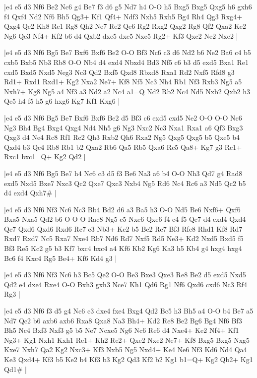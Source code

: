\whitename{}
\blackname{}
\makegametitle
|e4 e5 d3 Nf6 Be2 Nc6 g4 Be7 f3 d6 g5 Nd7 h4 O-O h5 Bxg5 Bxg5 Qxg5 h6 gxh6 f4 Qxf4 Nd2 Nf6 Bh5 Qg3+ Kf1 Qf4+ Ndf3 Nxh5 Rxh5 Bg4 Rh4 Qg3 Rxg4+ Qxg4 Qe2 Kh8 Re1 Rg8 Qh2 Ne7 Re2 Qe6 Rg2 Rxg2 Qxg2 Rg8 Qf2 Qxa2 Ke2 Ng6 Qe3 Nf4+ Kf2 b6 d4 Qxb2 dxe5 dxe5 Nxe5 Rg2+ Kf3 Qxc2 Ne2 Nxe2  |

\whitename{}
\blackname{}
\makegametitle
|e4 e5 d3 Nf6 Bg5 Be7 Bxf6 Bxf6 Be2 O-O Bf3 Nc6 c3 d6 Nd2 b6 Ne2 Ba6 c4 b5 cxb5 Bxb5 Nb3 Rb8 O-O Nb4 d4 exd4 Nbxd4 Bd3 Nf5 c6 b3 d5 exd5 Bxa1 Re1 cxd5 Bxd5 Nxd5 Neg3 Nc3 Qd2 Bxf5 Qxd8 Rbxd8 Rxa1 Rd2 Nxf5 Rfd8 g3 Rd1+ Rxd1 Rxd1+ Kg2 Nxa2 Ne7+ Kf8 Nf5 Nc3 Nh4 Rb1 Nf3 Rxb3 Ng5 a5 Nxh7+ Kg8 Ng5 a4 Nf3 a3 Nd2 a2 Nc4 a1=Q Nd2 Rb2 Nc4 Nd5 Nxb2 Qxb2 h3 Qe5 h4 f5 h5 g6 hxg6 Kg7 Kf1 Kxg6  |

\whitename{}
\blackname{}
\makegametitle
|e4 e5 d3 Nf6 Bg5 Be7 Bxf6 Bxf6 Be2 d5 Bf3 c6 exd5 cxd5 Ne2 O-O O-O Nc6 Ng3 Bh4 Bg4 Bxg4 Qxg4 Nd4 Nh5 g6 Ng3 Nxc2 Nc3 Nxa1 Rxa1 a6 Qf3 Bxg3 Qxg3 d4 Ne4 Rc8 Rf1 Rc2 Qh3 Rxb2 Qh6 Rxa2 Ng5 Qxg5 Qxg5 b5 Qxe5 b4 Qxd4 b3 Qc4 Rb8 Rb1 b2 Qxa2 Rb6 Qa5 Rb5 Qxa6 Rc5 Qa8+ Kg7 g3 Rc1+ Rxc1 bxc1=Q+ Kg2 Qd2  |

\whitename{}
\blackname{}
\makegametitle
|e4 e5 d3 Nf6 Bg5 Be7 h4 Nc6 c3 d5 f3 Be6 Na3 a6 b4 O-O Nh3 Qd7 g4 Rad8 exd5 Nxd5 Bxe7 Nxc3 Qc2 Qxe7 Qxc3 Nxb4 Ng5 Rd6 Nc4 Rc6 a3 Nd5 Qc2 b5 d4 exd4 Qxh7\#  |

\whitename{}
\blackname{}
\makegametitle
|e4 e5 d3 Nf6 Nf3 Nc6 Nc3 Bb4 Bd2 d6 a3 Ba5 h3 O-O Nd5 Be6 Nxf6+ Qxf6 Bxa5 Nxa5 Qd2 b6 O-O-O Rac8 Ng5 c5 Nxe6 Qxe6 f4 c4 f5 Qe7 d4 exd4 Qxd4 Qc7 Qxd6 Qxd6 Rxd6 Rc7 c3 Nb3+ Kc2 b5 Be2 Re7 Bf3 Rfe8 Rhd1 Kf8 Rd7 Rxd7 Rxd7 Nc5 Rxa7 Nxe4 Rb7 Nd6 Rd7 Nxf5 Rd5 Ne3+ Kd2 Nxd5 Bxd5 f5 Bf3 Re5 Kc2 g5 b3 Kf7 bxc4 bxc4 a4 Kf6 Kb2 Kg6 Ka3 h5 Kb4 g4 hxg4 hxg4 Bc6 f4 Kxc4 Rg5 Be4+ Kf6 Kd4 g3  |

\whitename{}
\blackname{}
\makegametitle
|e4 e5 d3 Nf6 Nf3 Nc6 h3 Bc5 Qe2 O-O Be3 Bxe3 Qxe3 Re8 Be2 d5 exd5 Nxd5 Qd2 e4 dxe4 Rxe4 O-O Bxh3 gxh3 Nce7 Kh1 Qd6 Rg1 Nf6 Qxd6 cxd6 Nc3 Rf4 Rg3  |

\whitename{}
\blackname{}
\makegametitle
|e4 e5 d3 Nf6 f3 d5 g4 Nc6 c3 dxe4 fxe4 Bxg4 Qd2 Bc5 h3 Bh5 a4 O-O b4 Be7 a5 Nd7 Qc2 b6 axb6 axb6 Rxa8 Qxa8 Na3 Bh4+ Kd2 Re8 Be2 Bg6 Bg4 Nf6 Bf3 Bh5 Nc4 Bxf3 Nxf3 g5 b5 Ne7 Ncxe5 Ng6 Nc6 Re6 d4 Nxe4+ Ke2 Nf4+ Kf1 Ng3+ Kg1 Nxh1 Kxh1 Re1+ Kh2 Re2+ Qxe2 Nxe2 Ne7+ Kf8 Bxg5 Bxg5 Nxg5 Kxe7 Nxh7 Qa2 Kg2 Nxc3+ Kf3 Nxb5 Ng5 Nxd4+ Ke4 Ne6 Nf3 Kd6 Nd4 Qa4 Ke3 Qxd4+ Kf3 b5 Ke2 b4 Kf3 b3 Kg2 Qd3 Kf2 b2 Kg1 b1=Q+ Kg2 Qb2+ Kg1 Qd1\#  |

